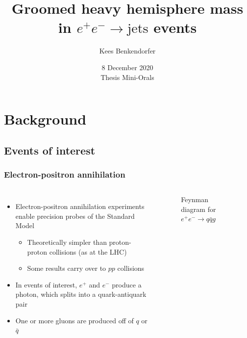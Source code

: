 \documentclass{beamer}
\title{Groomed heavy hemisphere mass in $e^+ e^- \to \text{jets}$ events}
\author{Kees Benkendorfer}
\institute{Reed College}
\date{8 December 2020 \\ Thesis Mini-Orals}
\begin{document}
\begin{frame}[noframenumbering]
	\thispagestyle{empty}
	\titlepage
\end{frame}

\section[Outline]{}
\frame{\tableofcontents}

\section{Background}
\subsection{Events of interest}
	\begin{frame}
		\frametitle{Electron-positron annihilation}
		\begin{columns}
		\begin{itemize}
			\item Electron-positron annihilation experiments enable precision probes of the Standard Model
			\begin{itemize}
				\item Theoretically simpler than proton-proton collisions (as at the LHC)

				\item Some results carry over to $pp$ collisions
			\end{itemize}

			\item In events of interest, $e^+$ and $e^-$ produce a photon, which splits into a quark-antiquark pair

			\item One or more gluons are produced off of $q$ or $\bar q$
		\end{itemize}

		\begin{figure}

			\caption{Feynman diagram for $e^+ e^- \to q\bar q g$}
		\end{figure}
		\end{columns}
	\end{frame}
\end{document}
